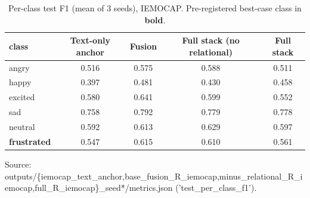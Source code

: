 \begin{table}[t]
\centering
\caption{Per-class test F1 (mean of 3 seeds), IEMOCAP. Pre-registered best-case class in \textbf{bold}.}
\label{tab:per-class-iemocap}
\begin{tabular}{lcccc}
\toprule
class & Text-only anchor & Fusion & Full stack (no relational) & Full stack \\
\midrule
angry & 0.516 & 0.575 & 0.588 & 0.511 \\
happy & 0.397 & 0.481 & 0.430 & 0.458 \\
excited & 0.580 & 0.641 & 0.599 & 0.552 \\
sad & 0.758 & 0.792 & 0.779 & 0.778 \\
neutral & 0.592 & 0.613 & 0.629 & 0.597 \\
\textbf{frustrated} & 0.547 & 0.615 & 0.610 & 0.561 \\
\bottomrule
\end{tabular}
\par\footnotesize Source: outputs/\{iemocap\_text\_anchor,base\_fusion\_R\_iemocap,minus\_relational\_R\_iemocap,full\_R\_iemocap\}\_seed*/metrics.json ('test\_per\_class\_f1').
\end{table}
